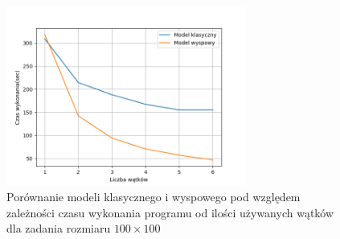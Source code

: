 \begin{figure}[H]
    \centering        
    \includegraphics[width=0.7\textwidth]{img/plot_compare_threads_100x100.png}
    \caption{Porównanie modeli klasycznego i wyspowego pod względem zależności czasu wykonania programu od ilości używanych wątków dla zadania 
    rozmiaru $100\times100$}
    \label{threads_regular_100x100}
\end{figure}